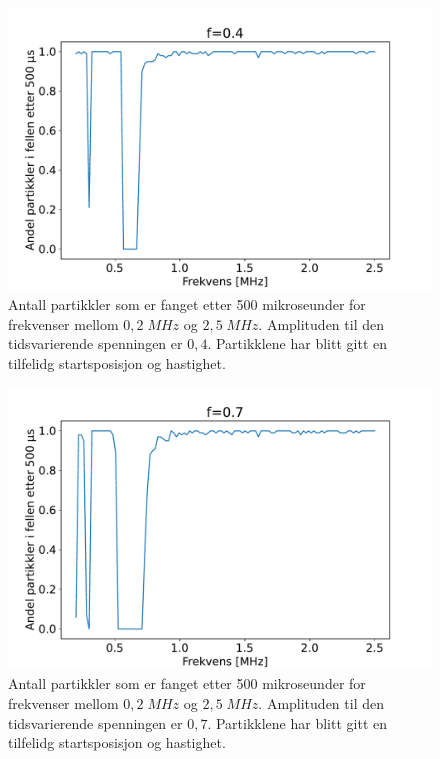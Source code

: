 \documentclass[reprint,english,notitlepage, nofootinbib]{revtex4-1}  %
\begin{document}
\begin{figure}[H]
\centering
\includegraphics[scale=0.4]{../Images/1Trapped.pdf}
\caption{Antall partikkler som er fanget etter 500 mikroseunder for frekvenser mellom $0,2 \; MHz$ og $2,5 \; MHz$. Amplituden til den tidsvarierende spenningen er $0,4$. Partikklene har blitt gitt en tilfelidg startsposisjon og hastighet.}
\label{Fig:Trapped04}
\end{figure}

\begin{figure}[H]
\centering
\includegraphics[scale=0.4]{../Images/2Trapped.pdf}
\caption{Antall partikkler som er fanget etter 500 mikroseunder for frekvenser mellom $0,2 \; MHz$ og $2,5 \; MHz$. Amplituden til den tidsvarierende spenningen er $0,7$. Partikklene har blitt gitt en tilfelidg startsposisjon og hastighet.}
\label{Fig:Trapped07}
\end{figure}
\end{document}
